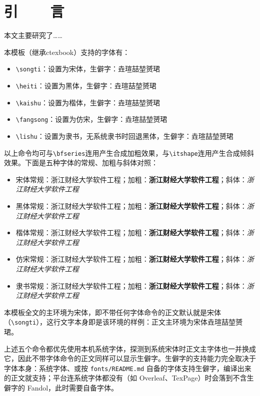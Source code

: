 
\chapter{引~~~~言}
本文主要研究了……

本模板（继承ctexbook）支持的字体有：
\begin{itemize}
  \item \verb|\songti|{\songti ：设置为宋体，生僻字：垚瑄喆堃赟珺}
  \item \verb|\heiti|{\heiti ：设置为黑体，生僻字：垚瑄喆堃赟珺}
  \item \verb|\kaishu|{\kaishu ：设置为楷体，生僻字：垚瑄喆堃赟珺}
  \item \verb|\fangsong|{\fangsong ：设置为仿宋，生僻字：垚瑄喆堃赟珺}
  \item \verb|\lishu|{\lishu ：设置为隶书，无系统隶书时回退黑体，生僻字：垚瑄喆堃赟珺}
\end{itemize}

以上命令均可与\verb|\bfseries|连用产生合成加粗效果，与\verb|\itshape|连用产生合成倾斜效果。下面是五种字体的常规、加粗与斜体对照：

\begin{itemize}
  \item 宋体常规：{\songti 浙江财经大学软件工程}；加粗：{\songti\bfseries 浙江财经大学软件工程}；斜体：{\songti\itshape 浙江财经大学软件工程}
  \item 黑体常规：{\heiti 浙江财经大学软件工程}；加粗：{\heiti\bfseries 浙江财经大学软件工程}；斜体：{\heiti\itshape 浙江财经大学软件工程}
  \item 楷体常规：{\kaishu 浙江财经大学软件工程}；加粗：{\kaishu\bfseries 浙江财经大学软件工程}；斜体：{\kaishu\itshape 浙江财经大学软件工程}
  \item 仿宋常规：{\fangsong 浙江财经大学软件工程}；加粗：{\fangsong\bfseries 浙江财经大学软件工程}；斜体：{\fangsong\itshape 浙江财经大学软件工程}
  \item 隶书常规：{\lishu 浙江财经大学软件工程}；加粗：{\lishu\bfseries 浙江财经大学软件工程}；斜体：{\lishu\itshape 浙江财经大学软件工程}
\end{itemize}

本模板全文的主环境为宋体，即不带任何字体命令的正文默认就是宋体（\verb|\songti|），这行文字本身即是该环境的样例：正文主环境为宋体垚瑄喆堃赟珺。

上述五个命令都优先使用本机系统字体，探测到系统宋体时正文主字体也一并换成它，因此不带字体命令的正文同样可以显示生僻字。生僻字的支持能力完全取决于字体本身：系统字体、或按 \verb|fonts/README.md| 自备的字体支持生僻字，编译出来的正文就支持；平台连系统字体都没有（如 Overleaf、TexPage）时会落到不含生僻字的 Fandol，此时需要自备字体。

